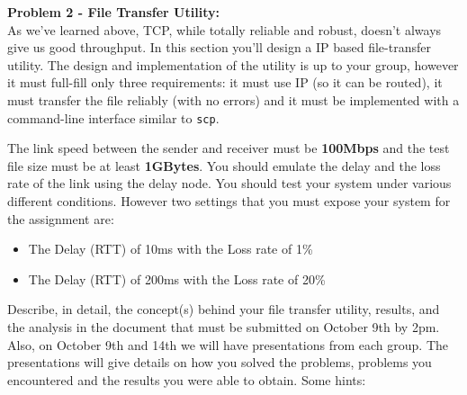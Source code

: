 \documentclass[10pt]{article}
\newcommand{\Problem}[1]{\noindent \textbf{\textbf{Problem #1:  \\ }}}
\begin{document}
\newpage


\Problem{2 - File Transfer Utility}
As we've learned above, TCP, while totally reliable and robust, doesn't always give us good throughput. In this section you'll design a IP based file-transfer utility. The design and implementation of the utility is up to your group, however it must full-fill only three requirements: it must use IP (so it can be routed), it must transfer the file reliably (with no errors) and it must be implemented with a command-line interface similar to \texttt{scp}.

The link speed between the sender and receiver must be \textbf{100Mbps} and the test file size must be at least \textbf{1GBytes}. You should emulate the delay and the loss rate of the link using the delay node. You should test your system under various different conditions. However two settings that you must expose your system for the assignment are:
\begin{itemize}
\itemsep0em
\item The Delay (RTT) of 10ms with the Loss rate of 1\%
\item The Delay (RTT) of 200ms with the Loss rate of 20\%
\end{itemize}
Describe, in detail, the concept(s) behind your file transfer utility, results, and the analysis in the document that must be submitted on October 9th by 2pm. Also, on October 9th and 14th we will have presentations from each group. The presentations will give details on how you solved the problems, problems you encountered and the results you were able to obtain. Some hints:
\end{document}
